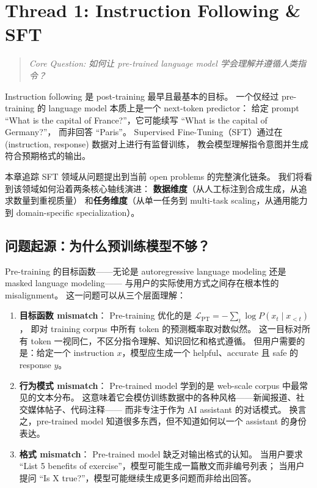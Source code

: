 \section{Thread 1: Instruction Following \& SFT}
\label{sec:t1}

\begin{quote}
\textit{Core Question: 如何让 pre-trained language model 学会理解并遵循人类指令？}
\end{quote}

Instruction following 是 post-training 最早且最基本的目标。
一个仅经过 pre-training 的 language model 本质上是一个 next-token predictor：
给定 prompt ``What is the capital of France?''，它可能续写 ``What is the capital of Germany?''，
而非回答 ``Paris''。
Supervised Fine-Tuning（SFT）通过在 (instruction, response) 数据对上进行有监督训练，
教会模型理解指令意图并生成符合预期格式的输出。

本章追踪 SFT 领域从问题提出到当前 open problems 的完整演化链条。
我们将看到该领域如何沿着两条核心轴线演进：
\textbf{数据维度}（从人工标注到合成生成，从追求数量到重视质量）
和\textbf{任务维度}（从单一任务到 multi-task scaling，从通用能力到 domain-specific specialization）。



\subsection{问题起源：为什么预训练模型不够？}
\label{sec:t1-origin}

Pre-training 的目标函数——无论是 autoregressive language modeling 还是 masked language modeling——
与用户的实际使用方式之间存在根本性的 misalignment。
这一问题可以从三个层面理解：

\begin{problembox}
\begin{enumerate}[leftmargin=1.5em]
  \item \textbf{目标函数 mismatch}：
    Pre-training 优化的是 $\mathcal{L}_{\text{PT}} = -\sum_t \log P(x_t \mid x_{<t})$，
    即对 training corpus 中所有 token 的预测概率取对数似然。
    这一目标对所有 token 一视同仁，不区分指令理解、知识回忆和格式遵循。
    但用户需要的是：给定一个 instruction $x$，模型应生成一个 helpful、accurate 且 safe 的 response $y$。

  \item \textbf{行为模式 mismatch}：
    Pre-trained model 学到的是 web-scale corpus 中最常见的文本分布。
    这意味着它会模仿训练数据中的各种风格——新闻报道、社交媒体帖子、代码注释——
    而非专注于作为 AI assistant 的对话模式。
    换言之，pre-trained model 知道很多东西，但不知道如何以一个 assistant 的身份表达。

  \item \textbf{格式 mismatch}：
    Pre-trained model 缺乏对输出格式的认知。
    当用户要求 ``List 5 benefits of exercise''，模型可能生成一篇散文而非编号列表；
    当用户提问 ``Is X true?''，模型可能继续生成更多问题而非给出回答。
\end{enumerate}
\end{problembox}

